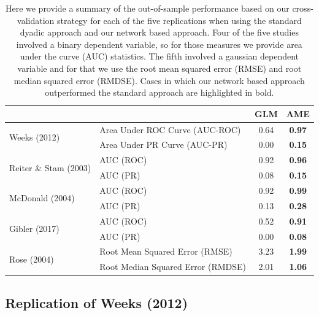 \begin{table}[ht]
\centering
	\begin{tabular}{l|l cc}
	~ & ~ & GLM & AME \\
	\hline\hline
		\multirow{2}{*}{Weeks (2012)} & Area Under ROC Curve (AUC-ROC) & 0.64 & \textbf{0.97} \\
		~ & Area Under PR Curve (AUC-PR) & 0.00 & \textbf{0.15} \\
		\hline
		\multirow{2}{*}{Reiter \& Stam (2003)} & AUC (ROC) & 0.92 & \textbf{0.96} \\
		~ & AUC (PR) & 0.08 & \textbf{0.15} \\
		\hline
		\multirow{2}{*}{McDonald (2004)} & AUC (ROC) & 0.92 & \textbf{0.99} \\
		~ & AUC (PR) & 0.13 & \textbf{0.28} \\
		\hline
		\multirow{2}{*}{Gibler (2017)} & AUC (ROC) & 0.52 & \textbf{0.91} \\
		~ & AUC (PR) & 0.00 & \textbf{0.08} \\
		\hline
		\multirow{2}{*}{Rose (2004)} & Root Mean Squared Error (RMSE) & 3.23 & \textbf{1.99} \\
		~ & Root Median Squared Error (RMDSE) & 2.01 & \textbf{1.06} \\
	\hline\hline
	\end{tabular}
	\caption{Here we provide a summary of the out-of-sample performance based on our cross-validation strategy for each of the five replications when using the standard dyadic approach and our network based approach. Four of the five studies involved a binary dependent variable, so for those measures we provide area under the curve (AUC) statistics. The fifth involved a gaussian dependent variable and for that we use the root mean squared error (RMSE) and root median squared error (RMDSE). Cases in which our network based approach outperformed the standard approach are highlighted in bold.}
	\label{tab:modelPerfSumm}
\end{table}
\FloatBarrier

\subsection{Replication of Weeks (2012)}

